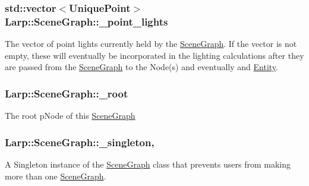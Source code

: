 \subsubsection[{\texorpdfstring{\+\_\+point\+\_\+lights}{_point_lights}}]{\setlength{\rightskip}{0pt plus 5cm}std\+::vector$<${\bf Unique\+Point}$>$ Larp\+::\+Scene\+Graph\+::\+\_\+point\+\_\+lights\hspace{0.3cm}{\ttfamily [private]}}\hypertarget{classLarp_1_1SceneGraph_a1b72e08d2d1edbf959b9fcad65a8241d}{}\label{classLarp_1_1SceneGraph_a1b72e08d2d1edbf959b9fcad65a8241d}
The vector of point lights currently held by the \hyperlink{classLarp_1_1SceneGraph}{Scene\+Graph}. If the vector is not empty, these will eventually be incorporated in the lighting calculations after they are passed from the \hyperlink{classLarp_1_1SceneGraph}{Scene\+Graph} to the Node(s) and eventually and \hyperlink{classLarp_1_1Entity}{Entity}. 
\subsubsection[{\texorpdfstring{\+\_\+root}{_root}}]{ Larp\+::\+Scene\+Graph\+::\+\_\+root\hspace{0.3cm}{\ttfamily [private]}}\hypertarget{classLarp_1_1SceneGraph_a88a58f51a6937827ae1d814d0b44a0d7}{}\label{classLarp_1_1SceneGraph_a88a58f51a6937827ae1d814d0b44a0d7}
The root p\+Node of this \hyperlink{classLarp_1_1SceneGraph}{Scene\+Graph} 
\subsubsection[{\texorpdfstring{\+\_\+singleton}{_singleton}}]{ Larp\+::\+Scene\+Graph\+::\+\_\+singleton\hspace{0.3cm}{\ttfamily [static]}, {\ttfamily [private]}}\hypertarget{classLarp_1_1SceneGraph_a93181088bdc8610fb5d56904b588426f}{}\label{classLarp_1_1SceneGraph_a93181088bdc8610fb5d56904b588426f}
A Singleton instance of the \hyperlink{classLarp_1_1SceneGraph}{Scene\+Graph} class that prevents users from making more than one \hyperlink{classLarp_1_1SceneGraph}{Scene\+Graph}. 
